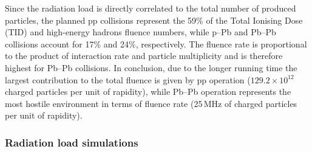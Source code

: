 \noindent Since the radiation load is directly correlated to the total number of produced particles, the planned pp collisions represent the 59$\%$ of the Total Ionising Dose (TID) and high-energy hadrons fluence numbers, while p--Pb and Pb--Pb collisions account for 17$\%$ and 24$\%$, respectively. The fluence rate is proportional to the product of interaction rate and particle multiplicity and is therefore highest for Pb--Pb collisions. In conclusion, 
due to the longer running time the largest contribution to the total fluence is given by pp operation ($129.2\times10^{12}$ charged particles per unit of rapidity), while Pb--Pb operation represents the most hostile environment in terms of fluence rate (25\,MHz of charged particles per unit of rapidity).\\


\subsubsection{Radiation load simulations}

